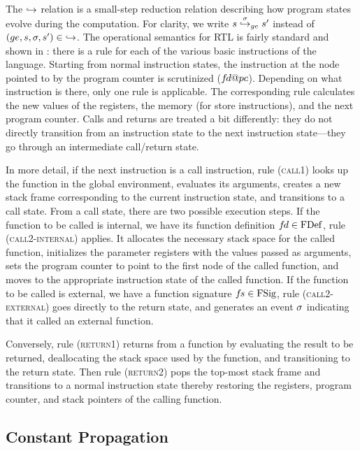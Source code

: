 

The $\stackrel{}{\hookrightarrow}$ relation is a small-step reduction relation describing how program states evolve
during the computation.  For clarity, we write $s \stackrel{\sigma}{\hookrightarrow}_{ge} s'$ instead of
$(ge,s,\sigma,s')\in {\stackrel{}{\hookrightarrow}}$.  The operational semantics for RTL is fairly standard and shown in
: there is a rule for each of the various basic instructions of the
language.  Starting from normal instruction states, the instruction at the node pointed to by the
program counter is scrutinized ($\vfd@pc$).  Depending on what instruction is there, only one rule
is applicable.  The corresponding rule calculates the new values of the registers, the memory (for
store instructions), and the next program counter.  Calls and returns are treated a bit differently:
they do not directly transition from an instruction state to the next instruction state---they go
through an intermediate call/return state.

In more detail, if the next instruction is a call instruction, rule (\textsc{call1}) looks up the
function in the global environment, evaluates its arguments, creates a new stack frame corresponding
to the current instruction state, and transitions to a call state.  From a call state, there are two
possible execution steps.  If the function to be called is internal, \ie we have its function
definition ${f\hspace*{-1pt}d}\in\mathrm{FDef}$, rule (\textsc{call2-internal}) applies.  It allocates the necessary
stack space for the called function, initializes the parameter registers with the values passed as
arguments, sets the program counter to point to the first node of the called function, and moves to
the appropriate instruction state of the called function.  If the function to be called is external,
\ie we have a function signature ${f\hspace*{-1pt}s}\in\mathrm{FSig}$, rule (\textsc{call2-external}) goes directly to
the return state, and generates an event $\sigma$ indicating that it called an external function.

Conversely, rule (\textsc{return1}) returns from a function by evaluating the result to be returned,
deallocating the stack space used by the function, and transitioning to the return state.  Then rule
(\textsc{return2}) pops the top-most stack frame and transitions to a normal instruction state
thereby restoring the registers, program counter, and stack pointers of the calling function.



\subsection{Constant Propagation}
\label{sec:background:constprop}

